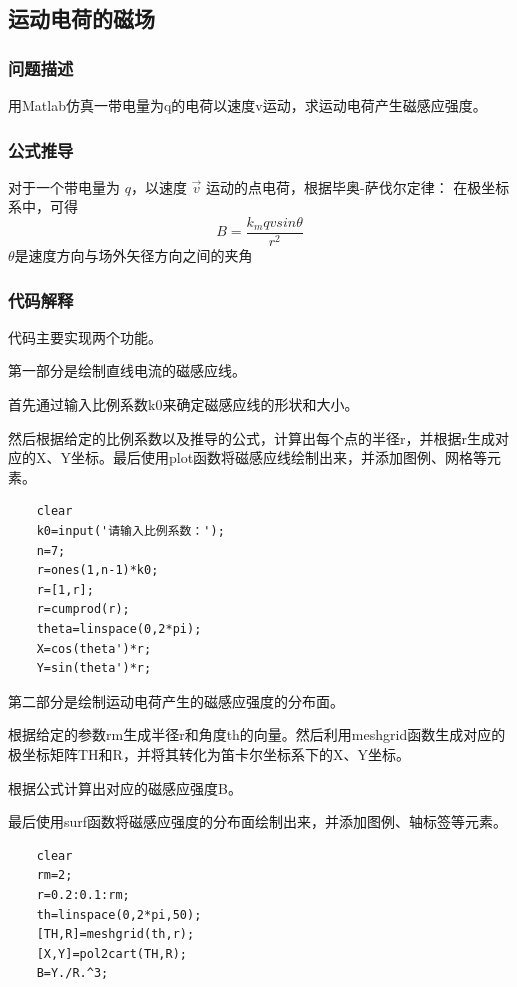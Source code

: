 \documentclass[UTF8]{article}
\numberwithin{figure}{subsection}
\numberwithin{table}{subsection}
\begin{document}
\begin{multicols}{2}
	\subsection{运动电荷的磁场}
	\subsubsection{问题描述}
	\par 用Matlab仿真一带电量为q的电荷以速度v运动，求运动电荷产生磁感应强度。
	\subsubsection{公式推导}
	\par 对于一个带电量为 $q$，以速度 $\vec{v}$ 运动的点电荷，根据毕奥-萨伐尔定律：
	在极坐标系中，可得
	$$B=\frac{k_m qvsin\theta}{r^2}$$
	$\theta$是速度方向与场外矢径方向之间的夹角
	\subsubsection{代码解释}
	\par 代码主要实现两个功能。
	\par 第一部分是绘制直线电流的磁感应线。
	\par 首先通过输入比例系数k0来确定磁感应线的形状和大小。
	\par 然后根据给定的比例系数以及推导的公式，计算出每个点的半径r，并根据r生成对应的X、Y坐标。最后使用plot函数将磁感应线绘制出来，并添加图例、网格等元素。
	\begin{lstlisting}
    clear
    k0=input('请输入比例系数：');
    n=7;
    r=ones(1,n-1)*k0;
    r=[1,r];
    r=cumprod(r);
    theta=linspace(0,2*pi);
    X=cos(theta')*r;
    Y=sin(theta')*r;
	\end{lstlisting}
	\par 第二部分是绘制运动电荷产生的磁感应强度的分布面。
	\par 根据给定的参数rm生成半径r和角度th的向量。然后利用meshgrid函数生成对应的极坐标矩阵TH和R，并将其转化为笛卡尔坐标系下的X、Y坐标。
	\par 根据公式计算出对应的磁感应强度B。
	\par 最后使用surf函数将磁感应强度的分布面绘制出来，并添加图例、轴标签等元素。
	\begin{lstlisting}
    clear
    rm=2;
    r=0.2:0.1:rm;
    th=linspace(0,2*pi,50);
    [TH,R]=meshgrid(th,r);
    [X,Y]=pol2cart(TH,R);
    B=Y./R.^3;
	\end{lstlisting}

\end{multicols}
\end{document}
